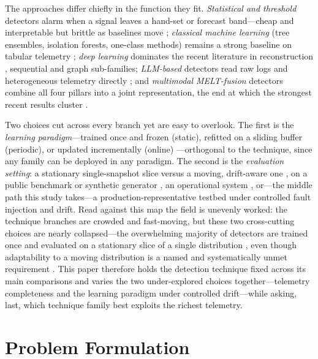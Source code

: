 \documentclass[pdflatex,sn-mathphys-num]{sn-jnl}%
\theoremstyle{thmstyleone}%
\theoremstyle{thmstyletwo}%
\theoremstyle{thmstylethree}%
\begin{document}
The approaches differ chiefly in the function they fit. \emph{Statistical and threshold} detectors alarm when a signal leaves a hand-set or forecast band---cheap and interpretable but brittle as baselines move \cite{mart2020,islam2021}; \emph{classical machine learning} (tree ensembles, isolation forests, one-class methods) remains a strong baseline on tabular telemetry \cite{lomio2022}; \emph{deep learning} dominates the recent literature in reconstruction \cite{dkmak2025}, sequential \cite{wang2025mtssurvey} and graph \cite{chen2023tracegra,akmeemana2025galmad,han2024} sub-families; \emph{LLM-based} detectors read raw logs and heterogeneous telemetry directly \cite{guan2024logllm,zhuang2024multimodal}; and \emph{multimodal MELT-fusion} detectors combine all four pillars into a joint representation, the end at which the strongest recent results cluster \cite{han2024,wang2025multimodal}.

Two choices cut across every branch yet are easy to overlook. The first is the \emph{learning paradigm}---trained once and frozen (static), refitted on a sliding buffer (periodic), or updated incrementally (online) \cite{wette2024omlad,li2023autoencoder}---orthogonal to the technique, since any family can be deployed in any paradigm. The second is the \emph{evaluation setting}: a stationary single-snapshot slice versus a moving, drift-aware one \cite{lukats2025drift}, on a public benchmark or synthetic generator \cite{bakhtin2025lo2,pham2025rcaeval}, an operational system \cite{islam2021,hrusto2026}, or---the middle path this study takes---a production-representative testbed under controlled fault injection and drift. Read against this map the field is unevenly worked: the technique branches are crowded and fast-moving, but these two cross-cutting choices are nearly collapsed---the overwhelming majority of detectors are trained once and evaluated on a stationary slice of a single distribution \cite{lomio2022,dkmak2025,han2024}, even though adaptability to a moving distribution is a named and systematically unmet requirement \cite{raeiszadeh2026}. This paper therefore holds the detection technique fixed across its main comparisons and varies the two under-explored choices together---telemetry completeness and the learning paradigm under controlled drift---while asking, last, which technique family best exploits the richest telemetry.

\section{Problem Formulation}\label{sec:problem}
\end{document}
